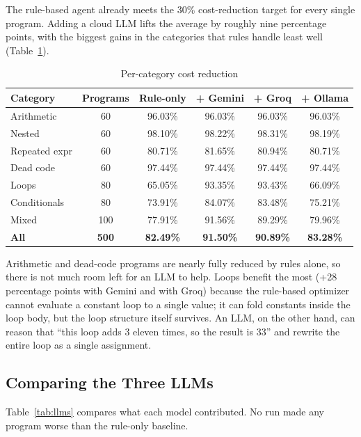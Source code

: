 \documentclass[12pt,a4paper]{report}
\begin{document}
The rule-based agent already meets the 30\% cost-reduction target for every single program. Adding a cloud LLM lifts the average by roughly nine percentage points, with the biggest gains in the categories that rules handle least well (Table~\ref{tab:categories}).

\begin{table}[H]
\centering
\caption{Per-category cost reduction}
\label{tab:categories}
\small
\begin{tabular}{|l|c|c|c|c|c|}
\hline
\textbf{Category} & \textbf{Programs} & \textbf{Rule-only} & \textbf{+ Gemini} & \textbf{+ Groq} & \textbf{+ Ollama} \\
\hline
Arithmetic & 60 & 96.03\% & 96.03\% & 96.03\% & 96.03\% \\
\hline
Nested & 60 & 98.10\% & 98.22\% & 98.31\% & 98.19\% \\
\hline
Repeated expr & 60 & 80.71\% & 81.65\% & 80.94\% & 80.71\% \\
\hline
Dead code & 60 & 97.44\% & 97.44\% & 97.44\% & 97.44\% \\
\hline
Loops & 80 & 65.05\% & 93.35\% & 93.43\% & 66.09\% \\
\hline
Conditionals & 80 & 73.91\% & 84.07\% & 83.48\% & 75.21\% \\
\hline
Mixed & 100 & 77.91\% & 91.56\% & 89.29\% & 79.96\% \\
\hline
\textbf{All} & \textbf{500} & \textbf{82.49\%} & \textbf{91.50\%} & \textbf{90.89\%} & \textbf{83.28\%} \\
\hline
\end{tabular}
\end{table}

Arithmetic and dead-code programs are nearly fully reduced by rules alone, so there is not much room left for an LLM to help. Loops benefit the most (+28 percentage points with Gemini and with Groq) because the rule-based optimizer cannot evaluate a constant loop to a single value; it can fold constants inside the loop body, but the loop structure itself survives. An LLM, on the other hand, can reason that ``this loop adds 3 eleven times, so the result is 33'' and rewrite the entire loop as a single assignment.

\subsection{Comparing the Three LLMs}

Table~\ref{tab:llms} compares what each model contributed. No run made any program worse than the rule-only baseline.
\end{document}

